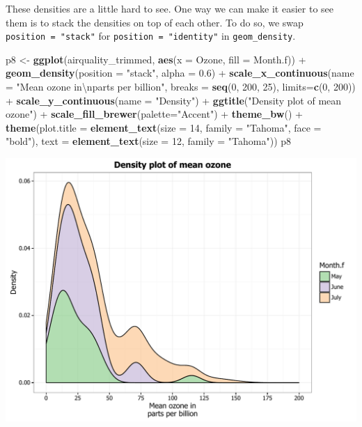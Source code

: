 \documentclass[]{article}
\newenvironment{Shaded}{\begin{snugshade}}{\end{snugshade}}
\newcommand{\KeywordTok}[1]{\textcolor[rgb]{0.13,0.29,0.53}{\textbf{{#1}}}}
\newcommand{\DataTypeTok}[1]{\textcolor[rgb]{0.13,0.29,0.53}{{#1}}}
\newcommand{\DecValTok}[1]{\textcolor[rgb]{0.00,0.00,0.81}{{#1}}}
\newcommand{\FloatTok}[1]{\textcolor[rgb]{0.00,0.00,0.81}{{#1}}}
\newcommand{\CharTok}[1]{\textcolor[rgb]{0.31,0.60,0.02}{{#1}}}
\newcommand{\StringTok}[1]{\textcolor[rgb]{0.31,0.60,0.02}{{#1}}}
\newcommand{\NormalTok}[1]{{#1}}
\begin{document}
These densities are a little hard to see. One way we can make it easier
to see them is to stack the densities on top of each other. To do so, we
swap \texttt{position\ =\ "stack"} for \texttt{position\ =\ "identity"}
in \texttt{geom\_density}.

\begin{Shaded}
\begin{Highlighting}[]
\NormalTok{p8 <-}\StringTok{ }\KeywordTok{ggplot}\NormalTok{(airquality_trimmed, }\KeywordTok{aes}\NormalTok{(}\DataTypeTok{x =} \NormalTok{Ozone, }\DataTypeTok{fill =} \NormalTok{Month.f)) +}\StringTok{ }
\StringTok{      }\KeywordTok{geom_density}\NormalTok{(}\DataTypeTok{position =} \StringTok{"stack"}\NormalTok{, }\DataTypeTok{alpha =} \FloatTok{0.6}\NormalTok{) +}
\StringTok{      }\KeywordTok{scale_x_continuous}\NormalTok{(}\DataTypeTok{name =} \StringTok{"Mean ozone in}\CharTok{\textbackslash{}n}\StringTok{parts per billion"}\NormalTok{,}
                         \DataTypeTok{breaks =} \KeywordTok{seq}\NormalTok{(}\DecValTok{0}\NormalTok{, }\DecValTok{200}\NormalTok{, }\DecValTok{25}\NormalTok{),}
                         \DataTypeTok{limits=}\KeywordTok{c}\NormalTok{(}\DecValTok{0}\NormalTok{, }\DecValTok{200}\NormalTok{)) +}
\StringTok{      }\KeywordTok{scale_y_continuous}\NormalTok{(}\DataTypeTok{name =} \StringTok{"Density"}\NormalTok{) +}
\StringTok{      }\KeywordTok{ggtitle}\NormalTok{(}\StringTok{"Density plot of mean ozone"}\NormalTok{) +}
\StringTok{      }\KeywordTok{scale_fill_brewer}\NormalTok{(}\DataTypeTok{palette=}\StringTok{"Accent"}\NormalTok{) +}
\StringTok{      }\KeywordTok{theme_bw}\NormalTok{() +}
\StringTok{      }\KeywordTok{theme}\NormalTok{(}\DataTypeTok{plot.title =} \KeywordTok{element_text}\NormalTok{(}\DataTypeTok{size =} \DecValTok{14}\NormalTok{, }\DataTypeTok{family =} \StringTok{"Tahoma"}\NormalTok{, }\DataTypeTok{face =} \StringTok{"bold"}\NormalTok{), }
            \DataTypeTok{text =} \KeywordTok{element_text}\NormalTok{(}\DataTypeTok{size =} \DecValTok{12}\NormalTok{, }\DataTypeTok{family =} \StringTok{"Tahoma"}\NormalTok{))}
\NormalTok{p8}
\end{Highlighting}
\end{Shaded}

\begin{center}\includegraphics{0_all_posts_pdf/density_17-1} \end{center}
\end{document}
